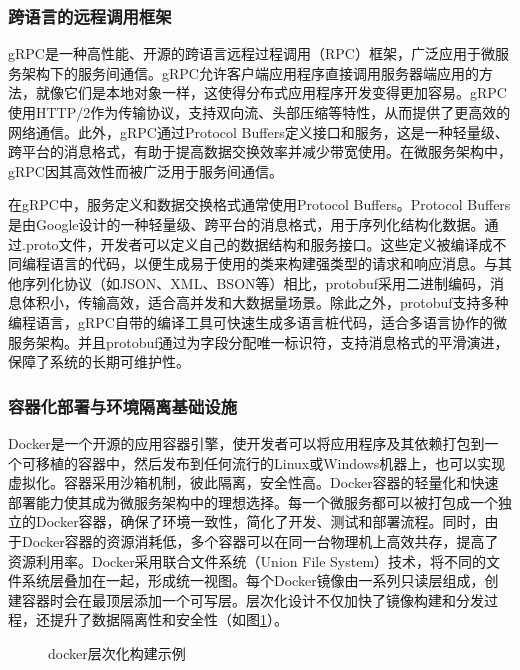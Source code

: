 \documentclass[UTF8,a4paper,12pt]{ctexart}
\numberwithin{equation}{section}
\begin{document}
\subsubsection{跨语言的远程调用框架}
gRPC是一种高性能、开源的跨语言远程过程调用（RPC）框架，广泛应用于微服务架构下的服务间通信。gRPC\cite{ref19}允许客户端应用程序直接调用服务器端应用的方法，就像它们是本地对象一样，这使得分布式应用程序开发变得更加容易。gRPC使用HTTP/2作为传输协议，支持双向流、头部压缩等特性，从而提供了更高效的网络通信。此外，gRPC通过Protocol Buffers定义接口和服务，这是一种轻量级、跨平台的消息格式，有助于提高数据交换效率并减少带宽使用。在微服务架构中，gRPC因其高效性而被广泛用于服务间通信。\par
在gRPC中，服务定义和数据交换格式通常使用Protocol Buffers。Protocol Buffers是由Google设计的一种轻量级、跨平台的消息格式，用于序列化结构化数据。通过.proto文件，开发者可以定义自己的数据结构和服务接口。这些定义被编译成不同编程语言的代码，以便生成易于使用的类来构建强类型的请求和响应消息。与其他序列化协议（如JSON、XML、BSON等）相比，protobuf采用二进制编码，消息体积小，传输高效，适合高并发和大数据量场景。除此之外，protobuf支持多种编程语言，gRPC自带的编译工具可快速生成多语言桩代码，适合多语言协作的微服务架构。并且protobuf通过为字段分配唯一标识符，支持消息格式的平滑演进，保障了系统的长期可维护性。

\subsubsection{容器化部署与环境隔离基础设施}
Docker\cite{ref20}是一个开源的应用容器引擎，使开发者可以将应用程序及其依赖打包到一个可移植的容器中，然后发布到任何流行的Linux或Windows机器上，也可以实现虚拟化。容器采用沙箱机制，彼此隔离，安全性高。Docker容器的轻量化和快速部署能力使其成为微服务架构中的理想选择。每一个微服务都可以被打包成一个独立的Docker容器，确保了环境一致性，简化了开发、测试和部署流程。同时，由于Docker容器的资源消耗低，多个容器可以在同一台物理机上高效共存，提高了资源利用率。Docker采用联合文件系统（Union File System）技术，将不同的文件系统层叠加在一起，形成统一视图。每个Docker镜像由一系列只读层组成，创建容器时会在最顶层添加一个可写层。层次化设计不仅加快了镜像构建和分发过程，还提升了数据隔离性和安全性（如图\ref{docker}）。\par
\begin{figure}[H]
	\caption{docker层次化构建示例}
	\label{docker}
\end{figure}
\end{document}
